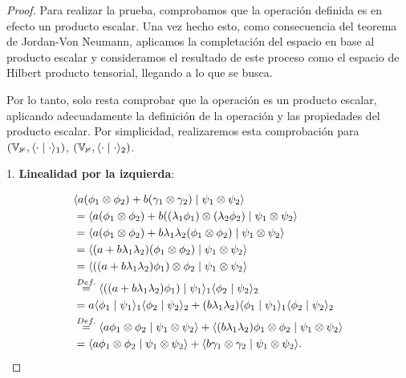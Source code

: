 \begin{proof}
    Para realizar la prueba, comprobamos que la operación definida es en efecto un producto escalar. Una vez hecho esto, como consecuencia del teorema de Jordan-Von Neumann, aplicamos la completación del espacio en base al producto escalar y consideramos el resultado de este proceso como el espacio de Hilbert producto tensorial, llegando a lo que se busca.

    Por lo tanto, solo resta comprobar que la operación es un producto escalar, aplicando adecuadamente la definición de la operación y las propiedades del producto escalar. Por simplicidad, realizaremos esta comprobación para $(\mathbb{V_1}, \innerproduct{\cdot}{\cdot}_1)$, $(\mathbb{V_2}, \innerproduct{\cdot}{\cdot}_2)$.

    1. \textbf{Linealidad por la izquierda}:

    \begin{equation}
    \begin{split}
        &\innerproduct{a(\phi_1 \otimes \phi_2) + b(\gamma_1 \otimes \gamma_2)}{\psi_1 \otimes \psi_2} \\
        &= \innerproduct{a(\phi_1 \otimes \phi_2) + b((\lambda_1 \phi_1) \otimes (\lambda_2 \phi_2)}{\psi_1 \otimes \psi_2} \\
        &= \innerproduct{a(\phi_1 \otimes \phi_2) + b \lambda_1 \lambda_2 (\phi_1 \otimes \phi_2)}{\psi_1 \otimes \psi_2} \\
        &= \innerproduct{(a + b \lambda_1 \lambda_2) (\phi_1 \otimes \phi_2)}{\psi_1 \otimes \psi_2} \\
        &= \innerproduct{((a + b \lambda_1 \lambda_2) \phi_1) \otimes \phi_2}{\psi_1 \otimes \psi_2} \\
        &\encima{=}{Def.} \innerproduct{((a + b \lambda_1 \lambda_2) \phi_1)}{\psi_1}_1 \innerproduct{\phi_2}{\psi_2}_2 \\
        &= a \innerproduct{\phi_1}{\psi_1}_1 \innerproduct{\phi_2}{\psi_2}_2 + (b \lambda_1 \lambda_2) \innerproduct{\phi_1}{\psi_1}_1 \innerproduct{\phi_2}{\psi_2}_2 \\
        &\encima{=}{Def.} \innerproduct{a \phi_1 \otimes \phi_2}{\psi_1 \otimes \psi_2} + \innerproduct{(b \lambda_1 \lambda_2) \phi_1 \otimes \phi_2}{\psi_1 \otimes \psi_2} \\
        &= \innerproduct{a \phi_1 \otimes \phi_2}{\psi_1 \otimes \psi_2} + \innerproduct{b \gamma_1 \otimes \gamma_2}{\psi_1 \otimes \psi_2}.
    \end{split}
    \end{equation}


\end{proof}
